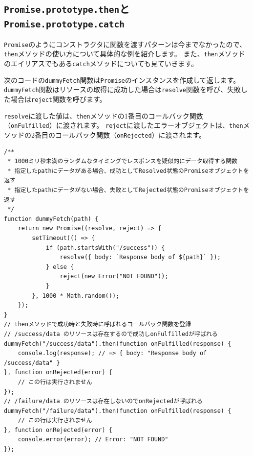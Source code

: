 \hypertarget{promise-then-and-catch}{%
\subsection{\texorpdfstring{\texttt{Promise.prototype.then}と\texttt{Promise.prototype.catch}}{Promise.prototype.thenとPromise.prototype.catch}}\label{promise-then-and-catch}}

\texttt{Promise}のようにコンストラクタに関数を渡すパターンは今までなかったので、\texttt{then}メソッドの使い方について具体的な例を紹介します。
また、\texttt{then}メソッドのエイリアスでもある\texttt{catch}メソッドについても見ていきます。

次のコードの\texttt{dummyFetch}関数は\texttt{Promise}のインスタンスを作成して返します。
\texttt{dummyFetch}関数はリソースの取得に成功した場合は\texttt{resolve}関数を呼び、失敗した場合は\texttt{reject}関数を呼びます。

\texttt{resolve}に渡した値は、\texttt{then}メソッドの1番目のコールバック関数（\texttt{onFulfilled}）に渡されます。
\texttt{reject}に渡したエラーオブジェクトは、\texttt{then}メソッドの2番目のコールバック関数（\texttt{onRejected}）に渡されます。\enlargethispage{\baselineskip}

\begin{lstlisting}
/**
 * 1000ミリ秒未満のランダムなタイミングでレスポンスを疑似的にデータ取得する関数
 * 指定したpathにデータがある場合、成功としてResolved状態のPromiseオブジェクトを返す
 * 指定したpathにデータがない場合、失敗としてRejected状態のPromiseオブジェクトを返す
 */
function dummyFetch(path) {
    return new Promise((resolve, reject) => {
        setTimeout(() => {
            if (path.startsWith("/success")) {
                resolve({ body: `Response body of ${path}` });
            } else {
                reject(new Error("NOT FOUND"));
            }
        }, 1000 * Math.random());
    });
}
// thenメソッドで成功時と失敗時に呼ばれるコールバック関数を登録
// /success/data のリソースは存在するので成功しonFulfilledが呼ばれる
dummyFetch("/success/data").then(function onFulfilled(response) {
    console.log(response); // => { body: "Response body of /success/data" }
}, function onRejected(error) {
    // この行は実行されません
});
// /failure/data のリソースは存在しないのでonRejectedが呼ばれる
dummyFetch("/failure/data").then(function onFulfilled(response) {
    // この行は実行されません
}, function onRejected(error) {
    console.error(error); // Error: "NOT FOUND"
});
\end{lstlisting}

